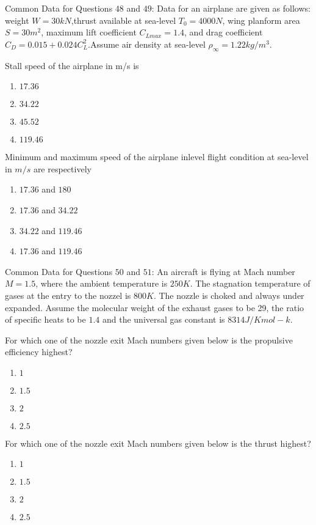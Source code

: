 Common Data for Questions $48$ and $49$: Data for an airplane are given as follows: weight $W=30kN$,thrust available at sea-level $T_0=4000 N$, wing planform area $S=30 m^2$, maximum lift coefficient $C_{Lmax}=1.4$, and drag coefficient $C_D=0.015+0.024 C_L^2$.Assume air density at sea-level $\rho_{\infty} = 1.22 kg/m^3.$
\item Stall speed of the airplane in m/s is
	\begin{enumerate}
		\item $17.36$ \item $34.22$ 
		\item $45.52$ \item $119.46$
	\end{enumerate}
\item Minimum and maximum speed of the airplane inlevel flight condition at sea-level in $m/s$ are respectively
	\begin{enumerate}
		\item $17.36$ and $180$
		\item $17.36$ and $34.22$
		\item $34.22$ and $119.46$
		\item $17.36$ and $119.46$
	\end{enumerate}
Common Data for Questions $50$ and $51$: An aircraft is flying at Mach number $M=1.5$, where the ambient temperature is $250 K$. The stagnation temperature of gases at the entry to the nozzel is $800 K$. The nozzle is choked and always under expanded. Assume the molecular weight of the exhaust gases to be 29, the ratio of specific heats to be $1.4$ and the universal gas constant is $8314 J/Kmol-k.$
\item For which one of the nozzle exit Mach numbers given below is the propulsive efficiency highest?
	\begin{enumerate}
		\item $1$ \item $1.5$\item $2$\item $2.5$
	\end{enumerate}
\item For which one of the nozzle exit Mach numbers given below is the thrust highest?
        \begin{enumerate}
                \item $1$ \item $1.5$\item $2$\item $2.5$
        \end{enumerate}

